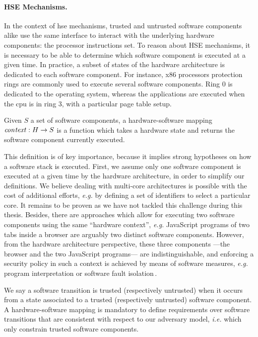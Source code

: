 \paragraph{HSE Mechanisms.}
%
In the context of \ac{hse} mechanisms, trusted and untrusted software components
alike use the same interface to interact with the underlying hardware
components: the processor instructions set.
%
To reason about HSE mechanisms, it is necessary to be able to determine which
software component is executed at a given time.
%
In practice, a subset of states of the hardware architecture is dedicated to
each software component.
%
For instance, x86 processors protection rings are commonly used to execute
several software components.
%
Ring 0 is dedicated to the operating system, whereas the applications are
executed when the \ac{cpu} is in ring 3, with a particular page table setup.

\begin{definition}
  \label{def:speccert:hardsoft}
  Given \( S \) a set of software components, a hardware-software mapping
  $\mathit{con\-text} : H \rightarrow S$ is a function which takes a hardware
  state and returns the software component currently executed.
\end{definition}

This definition is of key importance, because it implies strong hypotheses on
how a software stack is executed.
%
First, we assume only one software component is executed at a given time by the
hardware architecture, in order to simplify our definitions.
%
We believe dealing with multi-core architectures is possible with the cost of
additional efforts, \emph{e.g.} by defining a set of identifiers to select a
particular core.
%
It remains to be proven as we have not tackled this challenge during this
thesis.
%
Besides, there are approaches which allow for executing two software components
using the same ``hardware context'', \emph{e.g.} JavaScript programs of two tabs
inside a browser are arguably two distinct software components.
%
However, from the hardware architecture perspective, these three components
---the browser and the two JavaScript programs--- are indistinguishable, and
enforcing a security policy in such a context is achieved by means of software
measures, \emph{e.g.} program interpretation or software fault
isolation\,\cite{morrisett2012rocksalt}.

We say a software transition is trusted (respectively untrusted) when it occurs
from a state associated to a trusted (respectively untrusted) software
component.
%
A hardware-software mapping is mandatory to define requirements over software
transitions that are consistent with respect to our adversary model, \emph{i.e.}
which only constrain trusted software components.

